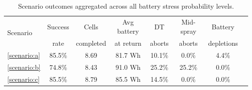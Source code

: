 \begin{table}[t]
\centering
\caption{Scenario outcomes aggregated across all battery stress probability
levels. }
\label{tab:outcomes}
  \setlength{\tabcolsep}{1.3pt}
\begin{tabular}{@{}lccccccc@{}}

\toprule
\multirow{2}{*}{Scenario}    & Success & Cells & Avg battery & DT& Mid-spray & Battery\\
  & rate & completed & at return & aborts &  aborts & depletions\\
\midrule
\ref{scenario:a}   & 85.5\% & 8.69 & 81.7 Wh &10.1\%& 0.0\% & 4.4\%\\
\ref{scenario:b}   & 74.8\% & 8.43 & 91.0 Wh &25.2\%& 25.2\% & 0.0\%\\
\ref{scenario:c}   & 85.5\% & 8.79 & 85.5 Wh &14.5\%& 0.0\% & 0.0\%\\
\bottomrule
\end{tabular}

\end{table}
